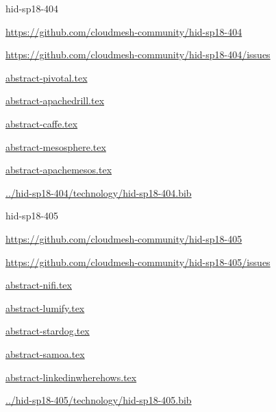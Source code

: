 \begin{IU}

hid-sp18-404

\url{https://github.com/cloudmesh-community/hid-sp18-404}

\url{https://github.com/cloudmesh-community/hid-sp18-404/issues}

\href{https://github.com/cloudmesh-community/hid-sp18-404/blob/master//technology/abstract-pivotal.tex}{abstract-pivotal.tex}

\href{https://github.com/cloudmesh-community/hid-sp18-404/blob/master//technology/abstract-apachedrill.tex}{abstract-apachedrill.tex}

\href{https://github.com/cloudmesh-community/hid-sp18-404/blob/master//technology/abstract-caffe.tex}{abstract-caffe.tex}

\href{https://github.com/cloudmesh-community/hid-sp18-404/blob/master//technology/abstract-mesosphere.tex}{abstract-mesosphere.tex}

\href{https://github.com/cloudmesh-community/hid-sp18-404/blob/master//technology/abstract-apachemesos.tex}{abstract-apachemesos.tex}

\href{https://github.com/cloudmesh-community/hid-sp18-404/blob/master//technology/hid-sp18-404.bib}{../hid-sp18-404/technology/hid-sp18-404.bib}

\end{IU}


\begin{IU}

hid-sp18-405

\url{https://github.com/cloudmesh-community/hid-sp18-405}

\url{https://github.com/cloudmesh-community/hid-sp18-405/issues}

\href{https://github.com/cloudmesh-community/hid-sp18-405/blob/master//technology/abstract-nifi.tex}{abstract-nifi.tex}

\href{https://github.com/cloudmesh-community/hid-sp18-405/blob/master//technology/abstract-lumify.tex}{abstract-lumify.tex}

\href{https://github.com/cloudmesh-community/hid-sp18-405/blob/master//technology/abstract-stardog.tex}{abstract-stardog.tex}

\href{https://github.com/cloudmesh-community/hid-sp18-405/blob/master//technology/abstract-samoa.tex}{abstract-samoa.tex}

\href{https://github.com/cloudmesh-community/hid-sp18-405/blob/master//technology/abstract-linkedinwherehows.tex}{abstract-linkedinwherehows.tex}

\href{https://github.com/cloudmesh-community/hid-sp18-405/blob/master//technology/hid-sp18-405.bib}{../hid-sp18-405/technology/hid-sp18-405.bib}

\end{IU}


